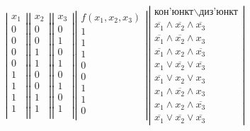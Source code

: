 \documentclass[14pt,a4paper]{scrartcl}
\theoremstyle{definition}
\theoremstyle{remark}
\theoremstyle{definition}
\theoremstyle{definition}
\begin{document}
 $$
 \left|
 \begin{gathered}
  x_1\\
  0\\
  0\\
  0\\
  0\\
  1\\
  1\\
  1\\
  1\\
 \end{gathered}
  \right|
  \left|
  \begin{gathered}
   x_2\\
   0\\
   0\\
   1\\
   1\\
   0\\
   0\\
   1\\
   1\\
  \end{gathered}
  \right|
  \left|
  \begin{gathered}
   x_3\\
   0\\
   1\\
   0\\
   1\\
   0\\
   1\\
   0\\
   1\\
  \end{gathered}
  \right|
  \left|
  \begin{gathered}
   f(x_1, x_2, x_3)\\
   1\\
   1\\
   1\\
   0\\
   0\\
   1\\
   1\\
   0\\
  \end{gathered}
  \right|
  \left|
  \begin{gathered}
   \text{кон'юнкт$\backslash$диз'юнкт}\\
 \overline{x_1} \land \overline{x_2} \land \overline{x_3}\\
 \overline{x_1} \land \overline{x_2} \land x_3\\
 \overline{x_1} \land x_2 \land \overline{x_3}\\
 x_1 \lor \overline{x_2} \lor \overline{x_3}\\
\overline{x_1} \lor x_2 \lor x_3\\
x_1\land \overline{x_2} \land x_3\\
x_1 \land x_2 \land \overline{x_3}\\
\overline{x_1} \lor \overline{x_2} \lor \overline{x_3}
  \end{gathered}
  \right|
 $$
\end{document}
